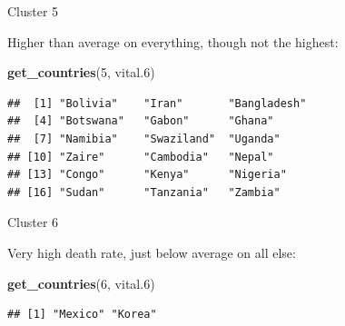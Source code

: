 \documentclass[ignorenonframetext,]{beamer}
\newenvironment{Shaded}{\begin{snugshade}}{\end{snugshade}}
\newcommand{\DecValTok}[1]{\textcolor[rgb]{0.00,0.00,0.81}{#1}}
\newcommand{\FloatTok}[1]{\textcolor[rgb]{0.00,0.00,0.81}{#1}}
\newcommand{\KeywordTok}[1]{\textcolor[rgb]{0.13,0.29,0.53}{\textbf{#1}}}
\newcommand{\NormalTok}[1]{#1}
\begin{document}
\begin{frame}[fragile]{Cluster 5}
\protect\hypertarget{cluster-5}{}

Higher than average on everything, though not the highest:

\begin{Shaded}
\begin{Highlighting}[]
\KeywordTok{get_countries}\NormalTok{(}\DecValTok{5}\NormalTok{, vital}\FloatTok{.6}\NormalTok{)}
\end{Highlighting}
\end{Shaded}

\begin{verbatim}
##  [1] "Bolivia"    "Iran"       "Bangladesh"
##  [4] "Botswana"   "Gabon"      "Ghana"     
##  [7] "Namibia"    "Swaziland"  "Uganda"    
## [10] "Zaire"      "Cambodia"   "Nepal"     
## [13] "Congo"      "Kenya"      "Nigeria"   
## [16] "Sudan"      "Tanzania"   "Zambia"
\end{verbatim}

\end{frame}

\begin{frame}[fragile]{Cluster 6}
\protect\hypertarget{cluster-6}{}

Very high death rate, just below average on all else:

\begin{Shaded}
\begin{Highlighting}[]
\KeywordTok{get_countries}\NormalTok{(}\DecValTok{6}\NormalTok{, vital}\FloatTok{.6}\NormalTok{)}
\end{Highlighting}
\end{Shaded}

\begin{verbatim}
## [1] "Mexico" "Korea"
\end{verbatim}

\end{frame}
\end{document}
